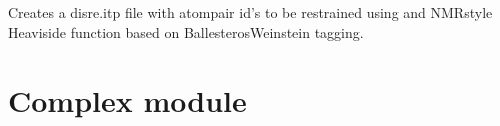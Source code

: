 \documentclass[letterpaper,10pt,english]{sphinxmanual}
\begin{document}
\begin{fulllineitems}
\begin{fulllineitems}
\end{fulllineitems}


\begin{fulllineitems}
\label{\detokenize{bw4posres:bw4posres.Run.makedisre}}
\pysigstartsignatures
{}
\pysigstopsignatures
\sphinxAtStartPar
Creates a disre.itp file with atom\sphinxhyphen{}pair id’s to be restrained
using and NMR\sphinxhyphen{}style Heaviside function based on
Ballesteros\sphinxhyphen{}Weinstein tagging.

\end{fulllineitems}


\end{fulllineitems}


\sphinxstepscope


\section{Complex module}
\label{\detokenize{complex:module-complex}}\label{\detokenize{complex:complex-module}}\label{\detokenize{complex::doc}}
\end{document}

